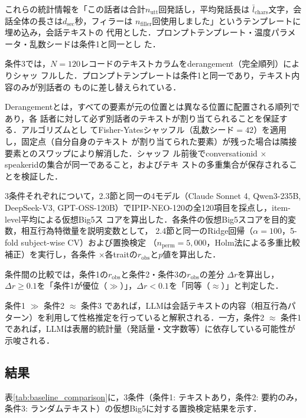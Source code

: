 \documentclass[dvipdfmx,11pt,a4paper]{bxjsarticle}
\renewcommand{\_}{\paperorigunderscore\allowbreak}%
\begin{document}
これらの統計情報を「この話者は合計$n_{\text{utt}}$回発話し，平均発話長は
$\bar{l}_{\text{chars}}$文字，会話全体の長さは$d_{\text{sec}}$秒，フィラーは
$n_{\text{filler}}$回使用しました」というテンプレートに埋め込み，会話テキストの
代用とした．プロンプトテンプレート・温度パラメータ・乱数シードは条件1と同一とし
た．

条件3では，$N = 120$レコードのテキストカラムをderangement（完全順列）によりシャッ
フルした．プロンプトテンプレートは条件1と同一であり，テキスト内容のみが別話者の
ものに差し替えられている．

Derangementとは，すべての要素が元の位置とは異なる位置に配置される順列であり，各
話者に対して必ず別話者のテキストが割り当てられることを保証する．アルゴリズムとし
てFisher-Yatesシャッフル（乱数シード$= 42$）を適用し，固定点（自分自身のテキスト
が割り当てられた要素）が残った場合は隣接要素とのスワップにより解消した．シャッフ
ル前後でconversation\_id $\times$ speaker\_idの集合が同一であること，およびテキ
ストの多重集合が保存されることを検証した．

3条件それぞれについて，2.3節と同一の4モデル（Claude Sonnet 4, Qwen3-235B, DeepSeek-V3,
GPT-OSS-120B）でIPIP-NEO-120の全120項目を採点し，item-level平均による仮想Big5ス
コアを算出した．各条件の仮想Big5スコアを目的変数，相互行為特徴量を説明変数として，
2.4節と同一のRidge回帰（$\alpha = 100$，5-fold subject-wise CV）および置換検定
（$n_{\text{perm}} = 5{,}000$，Holm法による多重比較補正）を実行し，各条件
$\times$各traitの$r_{\text{obs}}$と$p$値を算出した．


条件間の比較では，条件1の$r_{\text{obs}}$と条件2・条件3の$r_{\text{obs}}$の差分
$\Delta r$を算出し，$\Delta r \geq 0.1$を「条件1が優位（$\gg$）」，$\Delta r <
0.1$を「同等（$\approx$）」と判定した．

条件1 $\gg$ 条件2 $\approx$ 条件3 であれば，LLMは会話テキストの内容（相互行為パ
ターン）を利用して性格推定を行っていると解釈される．一方，条件2 $\approx$ 条件1
であれば，LLMは表層的統計量（発話量・文字数等）に依存している可能性が示唆される．

\subsection{結果}
\label{sec:result_baseline}

表\ref{tab:baseline_comparison}に，3条件（条件1: テキストあり，条件2: 要約のみ，
条件3: ランダムテキスト）の仮想Big5に対する置換検定結果を示す．
\end{document}
